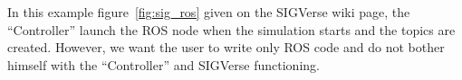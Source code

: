In this example figure~\ref{fig:sig_ros} given on the SIGVerse wiki page\cite{SIGVerseWikiROS}, the ``Controller'' launch the ROS node when the simulation starts and the topics are created. However, we want the user to write only ROS code and do not bother himself with the ``Controller'' and SIGVerse functioning.
\noindent\begin{minipage}{\linewidth}%
\label{fig:sig_ros}%
\end{minipage}


